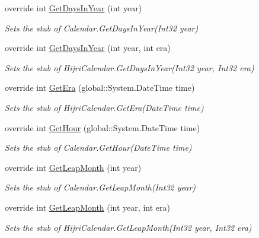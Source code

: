 \begin{DoxyCompactItemize}
override int \hyperlink{class_system_1_1_globalization_1_1_fakes_1_1_stub_hijri_calendar_aa7a62b6ab9b9541f3349477b5423edec}{Get\-Days\-In\-Year} (int year)
\begin{DoxyCompactList}\small\item\em Sets the stub of Calendar.\-Get\-Days\-In\-Year(\-Int32 year)\end{DoxyCompactList}\item 
override int \hyperlink{class_system_1_1_globalization_1_1_fakes_1_1_stub_hijri_calendar_a84a12925b47b6b09886d3caa17c67426}{Get\-Days\-In\-Year} (int year, int era)
\begin{DoxyCompactList}\small\item\em Sets the stub of Hijri\-Calendar.\-Get\-Days\-In\-Year(\-Int32 year, Int32 era)\end{DoxyCompactList}\item 
override int \hyperlink{class_system_1_1_globalization_1_1_fakes_1_1_stub_hijri_calendar_ab74cfe02ccf5888a9fc7af7a40e5abd8}{Get\-Era} (global\-::\-System.\-Date\-Time time)
\begin{DoxyCompactList}\small\item\em Sets the stub of Hijri\-Calendar.\-Get\-Era(\-Date\-Time time)\end{DoxyCompactList}\item 
override int \hyperlink{class_system_1_1_globalization_1_1_fakes_1_1_stub_hijri_calendar_afb132d558785eca0c001dccc05843516}{Get\-Hour} (global\-::\-System.\-Date\-Time time)
\begin{DoxyCompactList}\small\item\em Sets the stub of Calendar.\-Get\-Hour(\-Date\-Time time)\end{DoxyCompactList}\item 
override int \hyperlink{class_system_1_1_globalization_1_1_fakes_1_1_stub_hijri_calendar_ac998a33a279e7828a6343562b415c303}{Get\-Leap\-Month} (int year)
\begin{DoxyCompactList}\small\item\em Sets the stub of Calendar.\-Get\-Leap\-Month(\-Int32 year)\end{DoxyCompactList}\item 
override int \hyperlink{class_system_1_1_globalization_1_1_fakes_1_1_stub_hijri_calendar_a53ac29ce79281ff814c9af36daa98434}{Get\-Leap\-Month} (int year, int era)
\begin{DoxyCompactList}\small\item\em Sets the stub of Hijri\-Calendar.\-Get\-Leap\-Month(\-Int32 year, Int32 era)\end{DoxyCompactList}\item 

\end{DoxyCompactItemize}
